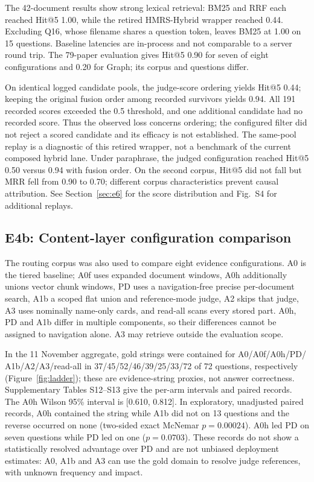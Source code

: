 The 42-document results show strong lexical retrieval: BM25 and RRF each
reached Hit@5 1.00, while the retired HMRS-Hybrid wrapper reached 0.44.
Excluding Q16, whose filename shares a question token, leaves BM25 at 1.00
on 15 questions. Baseline latencies are in-process and not comparable to a
server round trip. The 79-paper evaluation gives Hit@5 0.90 for seven of
eight configurations and 0.20 for Graph; its corpus and questions differ.

On identical logged candidate pools, the judge-score ordering yields Hit@5
0.44; keeping the original fusion order among recorded survivors yields 0.94.
All 191 recorded scores exceeded the 0.5 threshold, and one additional
candidate had no recorded score. Thus the observed loss concerns ordering;
the configured filter did not reject a scored candidate and its efficacy is
not established. The same-pool replay is a diagnostic of this retired wrapper,
not a benchmark of the current composed hybrid lane. Under paraphrase, the
judged configuration reached Hit@5 0.50 versus 0.94 with fusion order.
On the second corpus, Hit@5 did not fall but MRR fell from 0.90 to 0.70;
different corpus characteristics prevent causal attribution. See
Section~\ref{sec:e6} for the score distribution and Fig.~S4 for additional
replays.

\subsection{E4b: Content-layer configuration comparison}
\label{sec:ladder-opt}
The routing corpus was also used to compare eight evidence configurations.
A0 is the tiered baseline; A0f uses expanded document windows, A0h additionally
unions vector chunk windows, PD uses a navigation-free precise per-document
search, A1b a scoped flat union and reference-mode judge, A2 skips that judge,
A3 uses nominally name-only cards, and read-all scans every stored part.
A0h, PD and A1b differ in multiple components, so their differences cannot be
assigned to navigation alone. A3 may retrieve outside the evaluation scope.

In the 11 November aggregate, gold strings were contained for A0/A0f/A0h/PD/
A1b/A2/A3/read-all in 37/45/52/46/39/25/33/72 of 72 questions, respectively
(Figure~\ref{fig:ladder}); these are evidence-string proxies, not answer
correctness. Supplementary Tables S12--S13 give the per-arm intervals and
paired records. The A0h Wilson 95\% interval is [0.610, 0.812]. In exploratory,
unadjusted paired records, A0h contained the string while A1b did not on 13
questions and the reverse occurred on none (two-sided exact McNemar
$p=0.00024$). A0h led PD on seven questions while PD led on one
($p=0.0703$). These records do not show a statistically resolved advantage
over PD and are not unbiased deployment estimates: A0, A1b and A3 can use
the gold domain to resolve judge references, with unknown frequency and impact.


